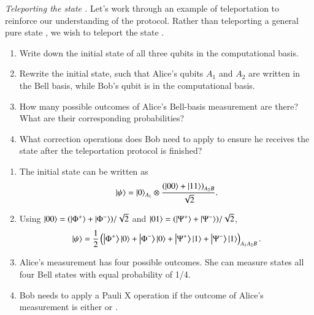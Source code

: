 \begin{exercise}
\emph{Teleporting the state .} Let's work through an example of teleportation to reinforce our understanding of the protocol. Rather than teleporting a general pure state \ket{\psi}, we wish to teleport the state .
\begin{enumerate}[label=(\alph*)]
    \item Write down the initial state of all three qubits in the computational basis.
    \item Rewrite the initial state, such that Alice's qubits $A_1$ and $A_2$ are written in the Bell basis, while Bob's qubit is in the computational basis.
    \item How many possible outcomes of Alice's Bell-basis measurement are there? What are their corresponding probabilities?
    \item What correction operations does Bob need to apply to ensure he receives the state  after the teleportation protocol is finished?
\end{enumerate}
\end{exercise}
\begin{solution}
\begin{enumerate}[label=(\alph*)]
    \item The initial state can be written as
    \begin{equation*}
        \left| \psi \right\rangle = \left| 0 \right\rangle_{A_1} \otimes \frac{\left(\left| 00 \right\rangle+\left| 11 \right\rangle \right)_{A_2B}}{\sqrt{2}}.
    \end{equation*}
    \item Using $\left| 00 \right\rangle=(\left| \Phi^+ \right\rangle+\left| \Phi^- \right\rangle)/\sqrt{2}$ and $\left| 01 \right\rangle=(\left| \Psi^+ \right\rangle+\left| \Psi^- \right\rangle)/\sqrt{2}$,
    \begin{equation*}
        \left| \psi \right\rangle = \frac{1}{2}\left( \left| \Phi^+ \right\rangle\left| 0 \right\rangle + \left| \Phi^- \right\rangle\left| 0 \right\rangle + \left| \Psi^+ \right\rangle\left| 1 \right\rangle + \left| \Psi^- \right\rangle\left| 1 \right\rangle \right)_{A_1A_2B}.
    \end{equation*}
    \item Alice's measurement has four possible outcomes. She can measure states all four Bell states with equal probability of 1/4.
    \item Bob needs to apply a Pauli X operation if the outcome of Alice's measurement is either \ket{\Psi^+} or \ket{\Psi^-}.
\end{enumerate}
\end{solution}

